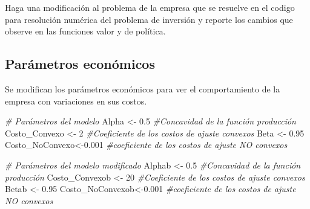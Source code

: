 \documentclass[
]{book}
\author{}
\date{\vspace{-2.5em}}
\newenvironment{Shaded}{\begin{snugshade}}{\end{snugshade}}
\newcommand{\CommentTok}[1]{\textcolor[rgb]{0.56,0.35,0.01}{\textit{#1}}}
\newcommand{\DecValTok}[1]{\textcolor[rgb]{0.00,0.00,0.81}{#1}}
\newcommand{\FloatTok}[1]{\textcolor[rgb]{0.00,0.00,0.81}{#1}}
\newcommand{\NormalTok}[1]{#1}
\newcommand{\OtherTok}[1]{\textcolor[rgb]{0.56,0.35,0.01}{#1}}
\begin{document}
\frontmatter

\mainmatter
Haga una modificación al problema de la empresa que se resuelve en el
codigo para resolución numérica del problema de inversión y reporte los
cambios que observe en las funciones valor y de política.

\hypertarget{paruxe1metros-econuxf3micos}{%
\subsection{Parámetros económicos}\label{paruxe1metros-econuxf3micos}}

Se modifican los parámetros económicos para ver el comportamiento de la
empresa con variaciones en sus costos.

\begin{Shaded}
\begin{Highlighting}[]
\CommentTok{\# Parámetros del modelo}
\NormalTok{Alpha }\OtherTok{\textless{}{-}} \FloatTok{0.5}  \CommentTok{\#Concavidad de la función producción}
\NormalTok{Costo\_Convexo }\OtherTok{\textless{}{-}} \DecValTok{2}  \CommentTok{\#Coeficiente de los costos de ajuste convexos}
\NormalTok{Beta }\OtherTok{\textless{}{-}} \FloatTok{0.95}
\NormalTok{Costo\_NoConvexo}\OtherTok{\textless{}{-}}\FloatTok{0.001}  \CommentTok{\#coeficiente de los costos de ajuste NO convexos}
\end{Highlighting}
\end{Shaded}

\begin{Shaded}
\begin{Highlighting}[]
\CommentTok{\# Parámetros del modelo modificado}
\NormalTok{Alphab }\OtherTok{\textless{}{-}} \FloatTok{0.5}  \CommentTok{\#Concavidad de la función producción}
\NormalTok{Costo\_Convexob }\OtherTok{\textless{}{-}} \DecValTok{20}  \CommentTok{\#Coeficiente de los costos de ajuste convexos}
\NormalTok{Betab }\OtherTok{\textless{}{-}} \FloatTok{0.95}
\NormalTok{Costo\_NoConvexob}\OtherTok{\textless{}{-}}\FloatTok{0.001}  \CommentTok{\#coeficiente de los costos de ajuste NO convexos}
\end{Highlighting}
\end{Shaded}
\end{document}
